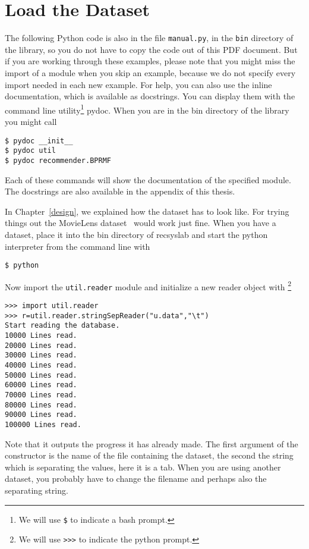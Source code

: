 \section{Load the Dataset}
The following Python code is also in the file \lstinline!manual.py!, in the \lstinline!bin! directory of the library,
so you do not have to copy the code out of this PDF document. But if you are working through these examples,
please note that you might miss the import of a module when you skip an example, because
we do not specify every import needed in each new example.
For help, you can also use the inline documentation, which is available as docstrings.
You can display them with the command line utility\footnote{We will use \lstinline!$! to indicate a bash prompt.} pydoc.
When you are in the bin directory of the library you might call

\begin{lstlisting}
$ pydoc __init__
$ pydoc util 
$ pydoc recommender.BPRMF
\end{lstlisting}
Each of these commands will show the documentation of the specified module.
The docstrings are also available in the appendix of this thesis.


In Chapter~\ref{design}, we explained how the dataset has to look like.
For trying things out the MovieLens dataset~\cite{movielensdatasets} would work just fine.
When you have a dataset, place it into the bin directory of recsyslab and start the
python interpreter from the command line with
\begin{lstlisting}
$ python
\end{lstlisting}
Now import the \lstinline!util.reader! module and initialize a new reader object with
\footnote{We will use \lstinline!>>>! to indicate the python prompt.}
\begin{lstlisting}[style=python]
>>> import util.reader
>>> r=util.reader.stringSepReader("u.data","\t")
Start reading the database.
10000 Lines read.
20000 Lines read.
30000 Lines read.
40000 Lines read.
50000 Lines read.
60000 Lines read.
70000 Lines read.
80000 Lines read.
90000 Lines read.
100000 Lines read.
\end{lstlisting}
Note that it outputs the progress it has already made.
The first argument of the constructor is the name of the file containing the dataset,
the second the string which is separating the values, here it is a tab. 
When you are using another dataset, you probably have to change the filename and perhaps
also the separating string.

